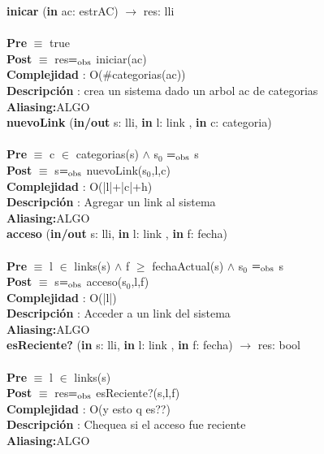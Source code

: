 \documentclass[10pt, a4paper]{article}
\begin{document}
	\textbf{inicar} (\textbf{in} ac: estrAC) $\longrightarrow$ res: lli\\\\
	\textbf{Pre} $\equiv$ {true}\\
	\textbf{Post} $\equiv$ {res$=_{\mathrm{obs}}$ iniciar(ac)}\\
	\textbf{Complejidad} : O($\#$categorias(ac))\\
	\textbf{Descripci\'{o}n} : crea un sistema dado un arbol ac de categorias\\
	\textbf{Aliasing:}ALGO \\
	
	\textbf{nuevoLink} (\textbf{in/out} s: lli, \textbf{in} l: link , \textbf{in} c: categoria) \\\\
	\textbf{Pre} $\equiv$ {c $\in$ categorias(s) $\wedge$ s${_0}$ $=_{\mathrm{obs}}$ s}\\
	\textbf{Post} $\equiv$ {s$=_{\mathrm{obs}}$ nuevoLink(s${_0}$,l,c)}\\
	\textbf{Complejidad} : O(|l|+|c|+h)\\
	\textbf{Descripci\'{o}n} : Agregar un link al sistema\\
	\textbf{Aliasing:}ALGO \\
	
	\textbf{acceso} (\textbf{in/out} s: lli, \textbf{in} l: link , \textbf{in} f: fecha) \\\\
	\textbf{Pre} $\equiv$ {l $\in$ links(s) $\wedge$ f $\geq$ fechaActual(s) $\wedge$ s${_0}$ $=_{\mathrm{obs}}$ s}\\
	\textbf{Post} $\equiv$ {s$=_{\mathrm{obs}}$ acceso(s${_0}$,l,f)}\\
	\textbf{Complejidad} : O(|l|)\\
	\textbf{Descripci\'{o}n} : Acceder a un link del sistema\\
	\textbf{Aliasing:}ALGO \\
		
	\textbf{esReciente?} (\textbf{in} s: lli, \textbf{in} l: link , \textbf{in} f: fecha) $\longrightarrow$ res: bool\\\\
	\textbf{Pre} $\equiv$ {l $\in$ links(s)}\\
	\textbf{Post} $\equiv$ {res$=_{\mathrm{obs}}$ esReciente?(s,l,f)}\\
	\textbf{Complejidad} : O(y esto q es??)\\
	\textbf{Descripci\'{o}n} : Chequea si el acceso fue reciente\\
	\textbf{Aliasing:}ALGO \\
	
\end{document}
